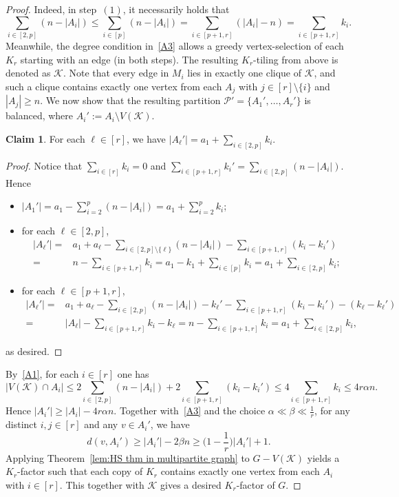 \documentclass[11pt, a4paper]{article}
\theoremstyle{definition}
\newtheorem{claim}[theorem]{Claim}
\newcommand{\<}{\subseteq}
\begin{document}
\begin{proof}
{Indeed, in step~$(1)$, it necessarily holds that $$\sum_{i\in [2,p]}(n-|A_i|)\leq \sum_{i\in [p]}(n-|A_i|)= \sum_{i\in [p+1,r]}(|A_i|-n)=\sum_{i\in [p+1,r]}k_i.$$
Meanwhile, the degree condition in~\ref{A3} allows a greedy vertex-selection of each $K_r$ starting with an edge (in both steps). The resulting $K_r$-tiling from above is denoted as $\mathcal{K}$. Note that  every edge in $M_i$ lies in exactly one  clique of $\mathcal{K}$, and such a clique  contains exactly  one vertex from each $A_j$ with $j\in [r]\setminus \{i\}$ and $|A_j|\geq n$.}  
We now show that the resulting partition $\mathcal{P}'=\{A_1', \ldots, A_r'\}$ is balanced, where $A_i':=A_i\setminus V(\mathcal{K}).$
\begin{claim}\label{result-balance}
    For each $\ell\in [r]$, we have $|A_{\ell}'|=a_1 + \sum_{i\in [2,p]} k_i$.
\end{claim}
\begin{proof}
Notice that $\sum_{i\in [r]}k_i=0$ and $\sum_{i\in [p+1,r]}k_i'=\sum_{i\in [2,p]}(n-|A_i|)$. Hence %
\begin{itemize}
    \item $|A_1'|= a_1-\sum_{i=2}^p(n-|A_i|)=a_1+\sum_{i=2}^pk_i$;
    \item for each $\ell\in [2,p]$, 
        \begin{align*}
        |A_{\ell}'|=&a_1+a_\ell-\sum_{i\in [2,p]\setminus\{\ell\}}(n-|A_i|)-\sum_{i\in [p+1,r]}(k_{i}-k_i')\\
        =&n-\sum_{i\in [p+1,r]}k_{i}=a_1-k_1+\sum_{i\in [p]}k_{i}=a_1+\sum_{i\in [2,p]}k_i;
        \end{align*}
        
    \item for each $\ell\in [p+1,r]$,                  \begin{align*}
        |A_{\ell}'|=&a_1+a_\ell-\sum_{i\in [2,p]}(n-|A_i|)-k_{\ell}'-\sum_{i\in [p+1,r]}(k_{i}-k_i')-(k_{\ell}-k_{\ell}')\\
        =&|A_{\ell}|-\sum_{i\in [p+1,r]}k_{i}-k_{\ell}=n-\sum_{i\in [p+1,r]}k_{i}=a_1+\sum_{i\in [2,p]}k_i,
        \end{align*}
\end{itemize}
as desired. 
\end{proof}

By~\ref{A1}, for each $i\in [r]$ one has 
$$|V(\mathcal{K})\cap A_i|\leq 2\sum_{i\in [2,p]}(n-|A_i|)+2\sum_{i\in [p+1,r]}(k_i-k_i')\leq 4\sum_{i\in [p+1,r]}k_i\leq 4r\alpha n.$$ %
Hence $|A_i'|\geq |A_i|-4r\alpha n$. Together with~\ref{A3} and the choice  $\alpha\ll\beta\ll\frac{1}{r}$, for any distinct $i,j \in [r]$ and any $v \in A_i'$, we have
\[
d(v, A_i') \ge |A_i'|-{2\beta}n\ge \Big(1-\frac{1}{r}\Big)|A_i'|+1.
\]
Applying Theorem~\ref{lem:HS thm in multipartite graph} to $G - V(\mathcal{K})$ yields a $K_r$-factor {such that each copy of $K_r$ contains exactly one vertex from each $A_i$ with $i\in [r]$}. This together with $\mathcal{K}$ gives a desired  $K_r$-factor of $G$. 
\end{proof}
\end{document}
